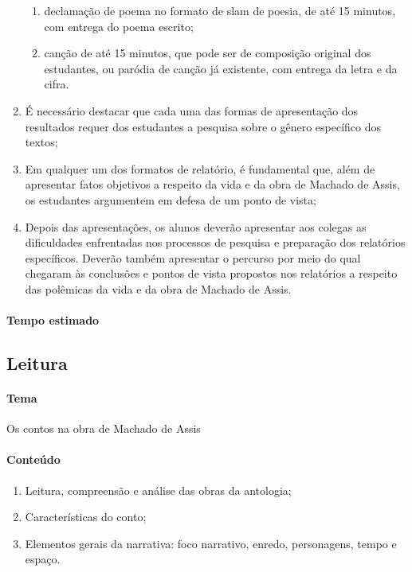 \documentclass[11pt]{extarticle}
\begin{document}
\begin{enumerate}
\begin{enumerate}
\item declamação de poema no formato de slam de poesia, de até 15 minutos, com
entrega do poema escrito;

\item canção de até 15 minutos, que pode ser de composição original dos
estudantes, ou paródia de canção já existente, com entrega da letra e da
cifra.
\end{enumerate}

\item
É necessário destacar que cada uma das formas de apresentação dos
resultados requer dos estudantes a pesquisa sobre o gênero específico
dos textos;

\item
Em qualquer um dos formatos de relatório, é fundamental que, além de
apresentar fatos objetivos a respeito da vida e da obra de Machado de
Assis, os estudantes argumentem em defesa de um ponto de vista;

\item
Depois das apresentações, os alunos deverão apresentar aos colegas as
dificuldades enfrentadas nos processos de pesquisa e preparação dos
relatórios específicos. Deverão também apresentar o percurso por meio do
qual chegaram às conclusões e pontos de vista propostos nos relatórios a
respeito das polêmicas da vida e da obra de Machado de Assis.
\end{enumerate}

\paragraph{Tempo estimado}

\subsection{Leitura}


\paragraph{Tema} Os contos na obra de Machado de Assis

\paragraph{Conteúdo} 
\begin{enumerate}
\item
Leitura, compreensão e análise das obras da
antologia; 
\item
Características do conto; 
\item
Elementos gerais da
narrativa: foco narrativo, enredo, personagens, tempo e espaço.
\end{enumerate}
\end{document}
